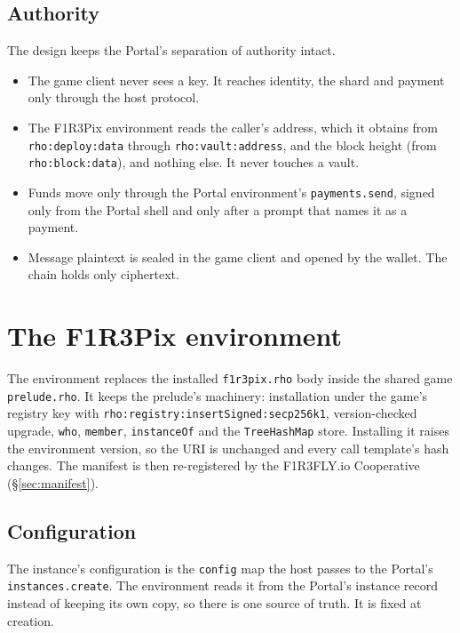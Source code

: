 \documentclass[11pt,a4paper]{article}
\newcommand{\code}[1]{\texttt{#1}}
\begin{document}
\subsection{Authority}

The design keeps the Portal's separation of authority intact.

\begin{itemize}[leftmargin=1.2em,itemsep=2pt]
\item The game client never sees a key. It reaches identity, the shard and payment only
  through the host protocol.
\item The F1R3Pix environment reads the caller's address, which it obtains from
  \code{rho:deploy:data} through \code{rho:vault:address}, and the block height (from \code{rho:block:data}), and nothing
  else. It never touches a vault.
\item Funds move only through the Portal environment's \code{payments.send}, signed only from
  the Portal shell and only after a prompt that names it as a payment.
\item Message plaintext is sealed in the game client and opened by the wallet. The chain holds
  only \mbox{ciphertext}.
\end{itemize}

\section{The F1R3Pix environment}\label{sec:env}

The environment replaces the installed \code{f1r3pix.rho} body inside the shared game
\code{prelude.rho}. It keeps the prelude's machinery: installation under the game's registry
key with \code{rho:registry:\allowbreak insertSigned:\allowbreak secp256k1}, version-checked upgrade, \code{who},
\code{member}, \code{instanceOf} and the \code{TreeHashMap} store. Installing it raises the
environment version, so the URI is unchanged and every call template's hash changes. The
manifest is then re-registered by the F1R3FLY.io Cooperative (\S\ref{sec:manifest}).

\subsection{Configuration}

The instance's configuration is the \code{config} map the host passes to the Portal's
\code{instances.create}. The environment reads it from the Portal's instance record instead of
keeping its own copy, so there is one source of truth. It is fixed at creation.
\end{document}
